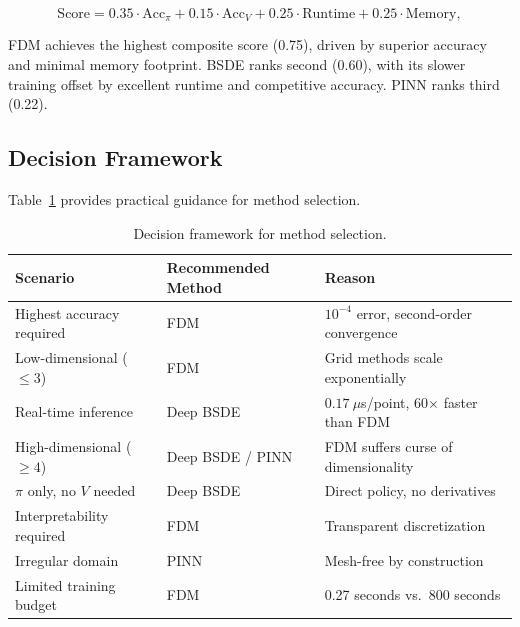 \documentclass[12pt,a4paper]{article}
\begin{document}
\begin{equation}
\label{eq:composite}
\text{Score} = 0.35 \cdot \text{Acc}_\pi + 0.15 \cdot \text{Acc}_V + 0.25 \cdot \text{Runtime} + 0.25 \cdot \text{Memory},
\end{equation}

\begin{table}[H]
\centering
\caption{Overall benchmark scores. All metrics normalized to $[0, 1]$ where 1.0 is best.}
\label{tab:overall_score}

\end{table}

FDM achieves the highest composite score (0.75), driven by superior accuracy and minimal memory footprint. BSDE ranks second (0.60), with its slower training offset by excellent runtime and competitive accuracy. PINN ranks third (0.22).

\subsection{Decision Framework}

Table~\ref{tab:decision_framework} provides practical guidance for method selection.

\begin{table}[H]
\centering
\caption{Decision framework for method selection.}
\label{tab:decision_framework}
\begin{tabular}{lp{6cm}p{4cm}}
\toprule
\textbf{Scenario} & \textbf{Recommended Method} & \textbf{Reason} \\
\midrule
Highest accuracy required & FDM & $10^{-4}$ error, second-order convergence \\[0.5em]
Low-dimensional ($\le 3$) & FDM & Grid methods scale exponentially \\[0.5em]
Real-time inference & Deep BSDE & $0.17\ \mu$s/point, 60$\times$ faster than FDM \\[0.5em]
High-dimensional ($\ge 4$) & Deep BSDE / PINN & FDM suffers curse of dimensionality \\[0.5em]
$\pi$ only, no $V$ needed & Deep BSDE & Direct policy, no derivatives \\[0.5em]
Interpretability required & FDM & Transparent discretization \\[0.5em]
Irregular domain & PINN & Mesh-free by construction \\[0.5em]
Limited training budget & FDM & 0.27 seconds vs.\ 800 seconds \\[0.5em]
\bottomrule
\end{tabular}
\end{table}
\end{document}
